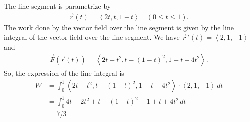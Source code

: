 	The line segment is parametrize by
		\begin{align*}
		\vec{r} (t) = \left\langle 2t , t , 1 - t \right\rangle \quad (0 \leq t \leq 1 ) .
		\end{align*}
	The work done by the vector field over the line segment is given by the line integral of the vector field over the line segment. We have $\vec{r}\,' (t) = \left\langle 2 , 1 , -1 \right\rangle$ and
		\begin{align*}
		\vec{F} (\vec{r}(t)) = \left\langle 2t - t^2 , t - (1 - t)^2 , 1 - t - 4t^2 \right\rangle .
		\end{align*}
	So, the expression of the line integral is
		\begin{align*}
		W &= \int_0^1 \left\langle 2t - t^2 , t - (1 - t)^2 , 1 - t - 4t^2 \right\rangle \cdot \left\langle 2 , 1 , -1 \right\rangle \, dt \\
		&= \int_0^1 4t - 2t^2 + t - (1-t)^2 - 1 + t + 4t^2 \, dt \\
		&= 7/3
		\end{align*}


